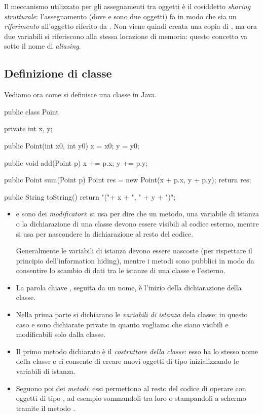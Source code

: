Il meccanismo utilizzato per gli assegnamenti tra oggetti è il cosiddetto \emph{sharing strutturale}: l'assegnamento  (dove  e  sono due oggetti) fa in modo che  sia un \emph{riferimento} all'oggetto riferito da . Non viene quindi creata una copia di , ma ora due variabili si riferiscono alla stessa locazione di memoria: questo concetto va sotto il nome di \emph{aliasing}.

\subsection{Definizione di classe}

Vediamo ora come si definisce una classe in Java.

% 
\begin{Java}
    public class Point {
        private int x, y;

        public Point(int x0, int y0){
            x = x0;
            y = y0;
        }

        public void add(Point p){
            x += p.x;
            y += p.y;
        }

        public Point sum(Point p){
            Point res = new Point(x + p.x, y + p.y);
            return res;
        }

        public String toString(){
            return "("+ x + ", " + y + ")"; 
        }
    }
\end{Java}

\begin{itemize}
    \item {} e  sono dei \emph{modificatori}:  si usa per dire che un metodo, una variabile di istanza o la dichiarazione di una classe devono essere visibili al codice esterno, mentre  si usa per nascondere la dichiarazione al resto del codice.
    
    Generalmente le variabili di istanza devono essere nascoste (per rispettare il principio dell'information hiding), mentre i metodi sono pubblici in modo da consentire lo scambio di dati tra le istanze di una classe e l'esterno.
    \item La parola chiave , seguita da un nome, è l'inizio della dichiarazione della classe.
    \item Nella prima parte si dichiarano le \emph{variabili di istanza} dela classe: in questo caso  e  sono dichiarate private in quanto vogliamo che siano visibili e modificabili solo dalla classe.
    \item Il primo metodo dichiarato è il \emph{costruttore della classe}: esso ha lo stesso nome della classe e ci consente di creare nuovi oggetti di tipo  inizializzando le variabili di istanza.
    \item Seguono poi dei \emph{metodi}: essi permettono al resto del codice di operare con oggetti di tipo , ad esempio sommandoli tra loro o stampandoli a schermo tramite il metodo .
\end{itemize}

